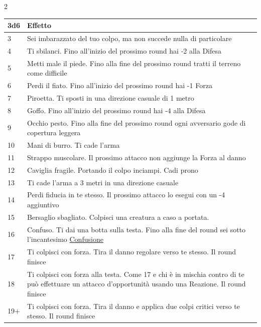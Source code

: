 {{\begin{multicols}{2}
\noindent\begin{tabularx}{\linewidth}{l|X}
	\toprule
\rowcolor{gray!20}\textbf{3d6} & \textbf{Effetto}\\
\toprule
3& Sei imbarazzato del tuo colpo, ma non succede nulla di particolare\\
\rowcolor{gray!20}4& Ti sbilanci. Fino all'inizio del prossimo round hai -2 alla Difesa\\
5& Metti male il piede. Fino alla fine del prossimo round tratti il terreno come difficile\\
\rowcolor{gray!20}6& Perdi il fiato. Fino all'inizio del prossimo round hai -1 Forza\\
7& Piroetta. Ti sposti in una direzione casuale di 1 metro\\
\rowcolor{gray!20}8& Goffo. Fino all'inizio del prossimo round hai -4 alla Difesa\\
9& Occhio pesto. Fino alla fine del prossimo round ogni avversario gode di copertura leggera\\
\rowcolor{gray!20}10 & Mani di burro. Ti cade l'arma\\
11 & Strappo muscolare. Il prossimo attacco non aggiunge la Forza al danno\\
\rowcolor{gray!20}12 & Caviglia fragile. Portando il colpo inciampi. Cadi prono\\
13 & Ti cade l'arma a 3 metri in una direzione casuale\\
\rowcolor{gray!20}14 & Perdi fiducia in te stesso. Il prossimo attacco lo esegui con un -4 aggiuntivo\\
15 & Bersaglio sbagliato. Colpisci una creatura a caso a portata.\\
\rowcolor{gray!20}16 & Confuso. Ti dai una botta sulla testa. Fino alla fine del round sei sotto l'incantesimo \hyperlink{Confusione}{Confusione}\\
17 & Ti colpisci con forza. Tira il danno regolare verso te stesso. Il round finisce\\
\rowcolor{gray!20}18 & Ti colpisci con forza alla testa. Come 17 e chi è in mischia contro di te può effettuare un attacco d'opportunità usando una Reazione. Il round finisce\\
19+& Ti colpisci con forza. Tira il danno e applica due colpi critici verso te stesso. Il round finisce
\end{tabularx}

\medskip

\end{multicols}

}}
